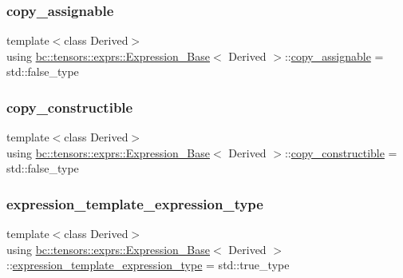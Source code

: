 \subsubsection{\texorpdfstring{copy\+\_\+assignable}{copy\_assignable}}
{\footnotesize\ttfamily template$<$class Derived$>$ \\
using \hyperlink{structbc_1_1tensors_1_1exprs_1_1Expression__Base}{bc\+::tensors\+::exprs\+::\+Expression\+\_\+\+Base}$<$ Derived $>$\+::\hyperlink{structbc_1_1tensors_1_1exprs_1_1Expression__Base_ab1be0cb2dd12cb2f0b3686481e0395ff}{copy\+\_\+assignable} =  std\+::false\+\_\+type}

\mbox{\label{structbc_1_1tensors_1_1exprs_1_1Expression__Base_a4e341022b3423c4310eda3891188cc30}} 
\subsubsection{\texorpdfstring{copy\+\_\+constructible}{copy\_constructible}}
{\footnotesize\ttfamily template$<$class Derived$>$ \\
using \hyperlink{structbc_1_1tensors_1_1exprs_1_1Expression__Base}{bc\+::tensors\+::exprs\+::\+Expression\+\_\+\+Base}$<$ Derived $>$\+::\hyperlink{structbc_1_1tensors_1_1exprs_1_1Expression__Base_a4e341022b3423c4310eda3891188cc30}{copy\+\_\+constructible} =  std\+::false\+\_\+type}

\mbox{\label{structbc_1_1tensors_1_1exprs_1_1Expression__Base_a3bd6a40f779c4054057f6de222e7148e}} 
\subsubsection{\texorpdfstring{expression\+\_\+template\+\_\+expression\+\_\+type}{expression\_template\_expression\_type}}
{\footnotesize\ttfamily template$<$class Derived$>$ \\
using \hyperlink{structbc_1_1tensors_1_1exprs_1_1Expression__Base}{bc\+::tensors\+::exprs\+::\+Expression\+\_\+\+Base}$<$ Derived $>$\+::\hyperlink{structbc_1_1tensors_1_1exprs_1_1Expression__Base_a3bd6a40f779c4054057f6de222e7148e}{expression\+\_\+template\+\_\+expression\+\_\+type} =  std\+::true\+\_\+type}

